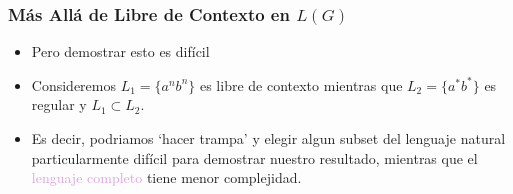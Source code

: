 \documentclass[compress,color=usenames]{beamer}
\newcommand{\mH}[1]{\textcolor{Plum}{#1}}
\begin{document}
\begin{frame}
\frametitle{M\'as All\'a de Libre de Contexto en $L(G)$}

\begin{itemize}

\item Pero demostrar esto es dif\'icil

\item Consideremos 
$L_1 = \{a^nb^n\}$ es libre de contexto mientras que $L_2 = \{a^*b^*\}$ es
regular y $L_1 \subset L_2$.

\item Es decir, podriamos `hacer trampa' y elegir algun subset del lenguaje natural 
particularmente dif\'icil para demostrar nuestro resultado, mientras que el \mH{lenguaje completo} tiene menor complejidad. 

\end{itemize}
\end{frame}








\end{document}
